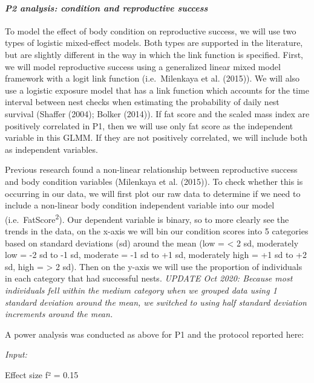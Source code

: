 \documentclass[
]{article}
\begin{document}
\hypertarget{p2-analysis-condition-and-reproductive-success}{%
\paragraph{\texorpdfstring{\emph{P2 analysis: condition and reproductive
success}}{P2 analysis: condition and reproductive success}}\label{p2-analysis-condition-and-reproductive-success}}

To model the effect of body condition on reproductive success, we will
use two types of logistic mixed-effect models. Both types are supported
in the literature, but are slightly different in the way in which the
link function is specified. First, we will model reproductive success
using a generalized linear mixed model framework with a logit link
function (i.e.~Milenkaya et al. (2015)). We will also use a logistic
exposure model that has a link function which accounts for the time
interval between nest checks when estimating the probability of daily
nest survival (Shaffer (2004); Bolker (2014)). If fat score and the
scaled mass index are positively correlated in P1, then we will use only
fat score as the independent variable in this GLMM. If they are not
positively correlated, we will include both as independent variables.

Previous research found a non-linear relationship between reproductive
success and body condition variables (Milenkaya et al. (2015)). To check
whether this is occurring in our data, we will first plot our raw data
to determine if we need to include a non-linear body condition
independent variable into our model (i.e.~FatScore\textsuperscript{2}).
Our dependent variable is binary, so to more clearly see the trends in
the data, on the x-axis we will bin our condition scores into 5
categories based on standard deviations (sd) around the mean (low =
\textless{} 2 sd, moderately low = -2 sd to -1 sd, moderate = -1 sd to
+1 sd, moderately high = +1 sd to +2 sd, high = \textgreater{} 2 sd).
Then on the y-axis we will use the proportion of individuals in each
category that had successful nests. \emph{UPDATE Oct 2020: Because most
individuals fell within the medium category when we grouped data using 1
standard deviation around the mean, we switched to using half standard
deviation increments around the mean.}

A power analysis was conducted as above for P1 and the protocol reported
here:

\emph{Input:}

Effect size f² = 0.15
\end{document}
